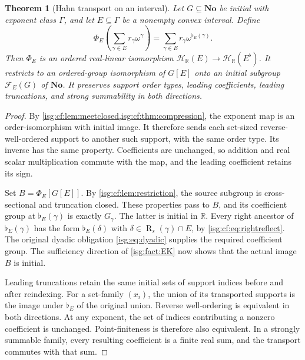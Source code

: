 \documentclass[11pt]{article}
\newtheorem{theorem}{Theorem}[section]
\theoremstyle{definition}
\theoremstyle{remark}
\newcommand{\No}{\ensuremath{\mathbf{No}}}
\newcommand{\R}{\mathbb{R}}
\newcommand{\Rs}{\operatorname{R}_{s}}
\newcommand{\Hahn}[2]{\mathcal{H}_{#1}(#2)}
\newcommand{\cmp}[1]{\flat_{#1}}
\begin{document}
\begin{theorem}[Hahn transport on an interval]\label{isg:cf:thm:transport}
Let $G\subseteq\No$ be initial with exponent class $\Gamma$, and let
$E\subseteq\Gamma$ be a nonempty convex interval. Define
\begin{equation}\label{isg:cf:eq:transport}
 \Phi_E\left(\sum_{\gamma\in E}r_\gamma\omega^\gamma\right)
  =\sum_{\gamma\in E}r_\gamma\omega^{\cmp E(\gamma)}.
\end{equation}
Then $\Phi_E$ is an ordered real-linear isomorphism
$\Hahn{\R}{E}\to\Hahn{\R}{E^\flat}$. It restricts to an ordered-group
isomorphism of $G[E]$ onto an initial subgroup $\mathcal F_E(G)$ of
$\No$. It preserves support order types, leading coefficients, leading
truncations, and strong summability in both directions.
\end{theorem}
\begin{proof}
By \cref{isg:cf:lem:meetclosed,isg:cf:thm:compression}, the exponent map
is an order-isomorphism with initial image. It therefore sends each
set-sized reverse-well-ordered support to another such support, with the
same order type. Its inverse has the same property. Coefficients are
unchanged, so addition and real scalar multiplication commute with the
map, and the leading coefficient retains its sign.

Set $B=\Phi_E[G[E]]$. By \cref{isg:cf:lem:restriction}, the source
subgroup is cross-sectional and truncation closed. These properties pass
to $B$, and its coefficient group at $\cmp E(\gamma)$ is exactly
$G_\gamma$. The latter is initial in $\R$. Every right ancestor of
$\cmp E(\gamma)$ has the form $\cmp E(\delta)$ with
$\delta\in\Rs(\gamma)\cap E$, by \eqref{isg:cf:eq:rightreflect}.
The original dyadic obligation \eqref{isg:eq:dyadic} supplies the required
coefficient group. The sufficiency direction of \cref{isg:fact:EK} now
shows that the actual image $B$ is initial.

Leading truncations retain the same initial sets of support indices
before and after reindexing. For a set-family $(x_i)$, the union of its
transported supports is the image under $\cmp E$ of the original union.
Reverse well-ordering is equivalent in both directions. At any exponent,
the set of indices contributing a nonzero coefficient is unchanged.
Point-finiteness is therefore also equivalent. In a strongly summable
family, every resulting coefficient is a finite real sum, and the
transport commutes with that sum.
\end{proof}
\end{document}

